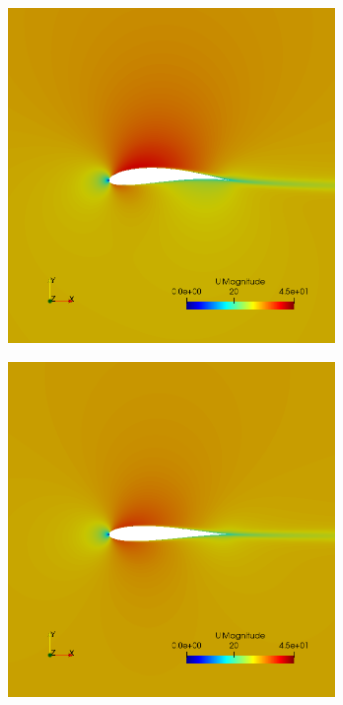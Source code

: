 \begin{figure}[h!]
    \centering
    \begin{subfigure}[t]{0.31\textwidth}
        \includegraphics[width=0.95\textwidth, height=0.17\textheight]{Figures/4/g10i14.png}
    \end{subfigure}
    \begin{subfigure}[t]{0.31\textwidth}
        \includegraphics[width=0.95\textwidth, height=0.17\textheight]{Figures/4/g10i35.png}

\end{subfigure}
\end{figure}
